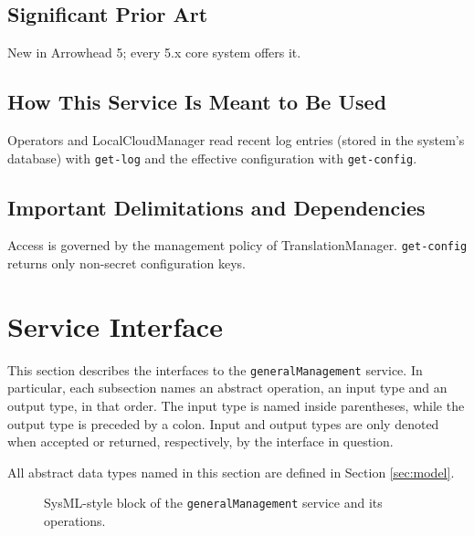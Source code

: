 \documentclass[a4paper]{arrowhead}
\begin{document}
\subsection{Significant Prior Art}

New in Arrowhead 5; every 5.x core system offers it.

\subsection{How This Service Is Meant to Be Used}

Operators and LocalCloudManager read recent log entries (stored in the system's database) with \texttt{get-\allowbreak{}log} and the effective configuration with \texttt{get-\allowbreak{}config}.

\subsection{Important Delimitations and Dependencies}
\label{sec:delimitations}

Access is governed by the management policy of Translation\allowbreak{}Manager. \texttt{get-\allowbreak{}config} returns only non-secret configuration keys.

\newpage

\section{Service Interface}
\label{sec:operations}

This section describes the interfaces to the \texttt{generalManagement} service.
In particular, each subsection names an abstract operation, an input type and an output type, in that order.
The input type is named inside parentheses, while the output type is preceded by a colon.
Input and output types are only denoted when accepted or returned, respectively, by the interface in question.

All abstract data types named in this section are defined in Section \ref{sec:model}.

\begin{figure}[ht!]
  \centering
  \caption{SysML-style block of the \texttt{generalManagement} service and its operations.}
  \label{fig:SD}
\end{figure}
\end{document}
